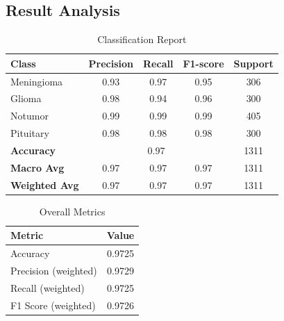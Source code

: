 \subsection{Result Analysis}




\begin{table}[h!]
\centering
\caption{Classification Report}
\begin{tabular}{lcccc}
\hline
\textbf{Class} & \textbf{Precision} & \textbf{Recall} & \textbf{F1-score} & \textbf{Support} \\
\hline
Meningioma & 0.93 & 0.97 & 0.95 & 306 \\
Glioma     & 0.98 & 0.94 & 0.96 & 300 \\
Notumor    & 0.99 & 0.99 & 0.99 & 405 \\
Pituitary  & 0.98 & 0.98 & 0.98 & 300 \\
\hline
\textbf{Accuracy} & \multicolumn{3}{c}{0.97} & 1311 \\
\textbf{Macro Avg} & 0.97 & 0.97 & 0.97 & 1311 \\
\textbf{Weighted Avg} & 0.97 & 0.97 & 0.97 & 1311 \\
\hline
\end{tabular}
\end{table}

\begin{table}[h!]
\centering
\caption{Overall Metrics}
\begin{tabular}{lc}
\hline
\textbf{Metric} & \textbf{Value} \\
\hline
Accuracy & 0.9725 \\
Precision (weighted) & 0.9729 \\
Recall (weighted) & 0.9725 \\
F1 Score (weighted) & 0.9726 \\
\hline
\end{tabular}
\end{table}


